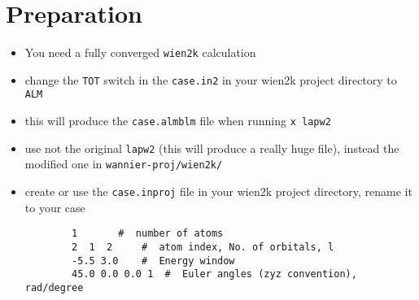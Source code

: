 \documentclass[a4paper,bibtotocnumbered]{scrartcl}
\begin{document}
\section{Preparation}
\begin{itemize}
	\item You need a fully converged \texttt{wien2k} calculation
	\item change the \texttt{TOT} switch in the \texttt{case.in2} in your
	wien2k project directory to \texttt{ALM}
	\item this will produce the \texttt{case.almblm} file when running \texttt{x lapw2}
	\item use not the original \texttt{lapw2} (this will produce a really huge file),
	instead the modified one in \texttt{wannier-proj/wien2k/}
	\item create or use the \texttt{case.inproj} file in your wien2k project
	directory, rename it to your case
	\begin{verbatim}
		1		#  number of atoms
		2  1  2		#  atom index, No. of orbitals, l
		-5.5 3.0	#  Energy window
		45.0 0.0 0.0 1	#  Euler angles (zyz convention), rad/degree 


\end{verbatim}
\end{itemize}
\end{document}
